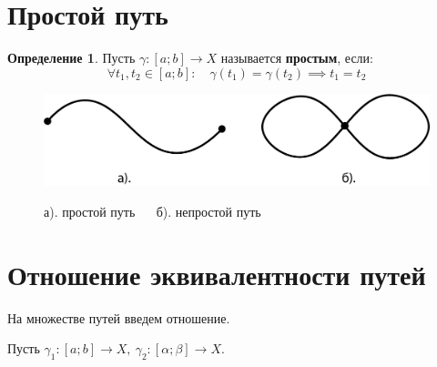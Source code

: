 \documentclass{report}
\theoremstyle{definition}
\newtheorem*{definition}{Определение}
\begin{document}
\section{Простой путь}

\begin{definition}
    Пусть $\gamma:[a;b]\rightarrow X$ называется \textbf{простым}, если:
    \begin{equation*}
        \forall t_1,t_2 \in[a;b]: \quad \gamma(t_1) = \gamma(t_2) \implies t_1 = t_2
    \end{equation*}
    \begin{figure}[H]
        \begin{center}
            \includegraphics[scale=0.2]{graph6.png}\label{figure6}

            а). простой путь $\quad$ б). непростой путь
        \end{center}
    \end{figure}
\end{definition}

\section{Отношение эквивалентности путей}

На множестве путей введем отношение.

Пусть $\gamma_1:[a;b]\rightarrow X, \ \gamma_2:[\alpha;\beta] \rightarrow X$.
\end{document}
